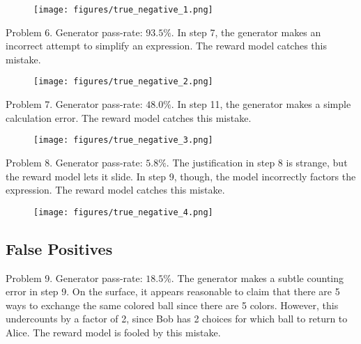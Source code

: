 \documentclass{article}
\begin{document}
\vspace{.25cm}

\begin{figure}[!h]
\centering
\texttt{[image: figures/true\_negative\_1.png]}
\end{figure}

\newpage

\noindent
Problem 6. Generator pass-rate: $93.5\%$. In step 7, the generator makes an incorrect attempt to simplify an expression. The reward model catches this mistake.

\vspace{.25cm}

\begin{figure}[!h]
\centering
\texttt{[image: figures/true\_negative\_2.png]}
\end{figure}

\vspace{1cm}

\noindent
Problem 7. Generator pass-rate: $48.0\%$. In step 11, the generator makes a simple calculation error. The reward model catches this mistake.

\vspace{.25cm}

\begin{figure}[!h]
\centering
\texttt{[image: figures/true\_negative\_3.png]}
\end{figure}

\newpage

\noindent
Problem 8. Generator pass-rate: $5.8\%$. The justification in step 8 is strange, but the reward model lets it slide. In step 9, though, the model incorrectly factors the expression. The reward model catches this mistake.

\vspace{.25cm}

\begin{figure}[!h]
\centering
\texttt{[image: figures/true\_negative\_4.png]}
\end{figure}

\subsection{False Positives}

Problem 9. Generator pass-rate: $18.5\%$. The generator makes a subtle counting error in step 9. On the surface, it appears reasonable to claim that there are 5 ways to exchange the same colored ball since there are 5 colors. However, this undercounts by a factor of 2, since Bob has 2 choices for which ball to return to Alice. The reward model is fooled by this mistake.
\end{document}
